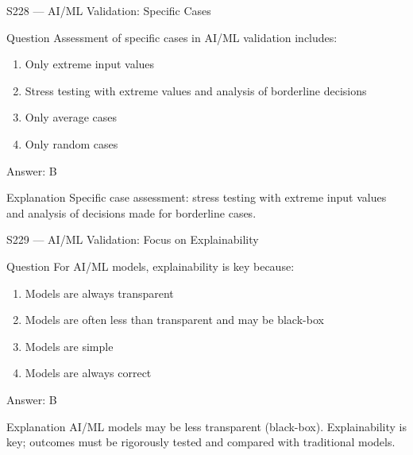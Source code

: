 \documentclass[aspectratio=169,8pt]{beamer}
\begin{document}
\begin{frame}{S228 --- AI/ML Validation: Specific Cases}
	\begin{block}{Question}
		Assessment of specific cases in AI/ML validation includes:
		\begin{enumerate}
			\item Only extreme input values
			\item Stress testing with extreme values and analysis of borderline decisions
			\item Only average cases
			\item Only random cases
		\end{enumerate}
	\end{block}
	\begin{exampleblock}{Answer: B}\end{exampleblock}
	\begin{block}{Explanation}
		Specific case assessment: stress testing with extreme input values and analysis of decisions made for borderline cases.
	\end{block}
\end{frame}

\begin{frame}{S229 --- AI/ML Validation: Focus on Explainability}
	\begin{block}{Question}
		For AI/ML models, explainability is key because:
		\begin{enumerate}
			\item Models are always transparent
			\item Models are often less than transparent and may be black-box
			\item Models are simple
			\item Models are always correct
		\end{enumerate}
	\end{block}
	\begin{exampleblock}{Answer: B}\end{exampleblock}
	\begin{block}{Explanation}
		AI/ML models may be less transparent (black-box). Explainability is key; outcomes must be rigorously tested and compared with traditional models.
	\end{block}
\end{frame}
\end{document}
